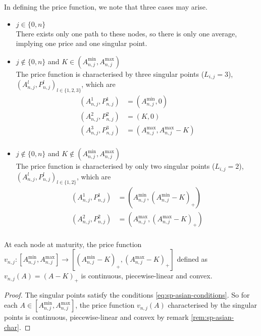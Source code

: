 In defining the price function, we note that three cases may arise.
\begin{itemize}
\item $ j \in \{ 0, n \} $ \\
	There exists only one path to these nodes, so there is only one average, implying one price and one singular point.
	
\item $ j \notin \{ 0, n \} $ and $ K \in ( A_{n,j}^{\min}, A_{n,j}^{\max} ) $ \\	
	The price function is characterised by three singular points ($ L_{i,j} = 3 $), $ ( A_{n,j}^l , P_{n,j}^l )_{l \in \{ 1, 2, 3 \} } $, which are \\
	\begin{equation} \label{eq:sp-asian-price-maturity-kin}
		\begin{aligned}
			( A_{n,j}^1 , P_{n,j}^1 ) &= ( A_{n,j}^{\min} , 0 ) \\
			( A_{n,j}^2 , P_{n,j}^2 ) &= ( K , 0 ) \\
			( A_{n,j}^3 , P_{n,j}^3 ) &= ( A_{n,j}^{\max} , A_{n,j}^{\max} - K ) \\
		\end{aligned}
	\end{equation} \label{eq:sp-asian-price-maturity-kout}
	
\item $ j \notin \{ 0, n \} $ and $ K \notin ( A_{n,j}^{\min}, A_{n,j}^{\max} ) $ \\
	The price function is characterised by only two singular points ($ L_{i,j} = 2 $), $ ( A_{n,j}^l , P_{n,j}^l )_{l \in \{ 1, 2 \} } $, which are \\
	\begin{equation}
		\begin{aligned}
			( A_{n,j}^1 , P_{n,j}^1 ) &= ( A_{n,j}^{\min} , ( A_{n,j}^{\min} - K )_+ ) \\
			( A_{n,j}^2 , P_{n,j}^2 ) &= ( A_{n,j}^{\max} , ( A_{n,j}^{\max} - K )_+ ) \\
		\end{aligned}
	\end{equation}
\end{itemize}

\begin{lmm}
	\label{lmm:sp-asian-pr-maturity}
	At each node at maturity, the price function $ { v_{n,j}: \left[ A_{n,j}^{\min}, A_{n,j}^{\max} \right] \to \left[ ( A_{n,j}^{\min} - K )_+ , ( A_{n,j}^{\max} - K )_+ \right] } $ defined as $ v_{n,j}(A) = (A - K)_+ $ is continuous, piecewise-linear and convex.
\end{lmm}
\begin{proof}
	The singular points satisfy the conditions \ref{eq:sp-asian-conditions}. So for each $ A \in \left[ A_{n,j}^{\min}, A_{n,j}^{\max} \right] $, the price function ${ v_{n,j}(A) }$ characterised by the singular points is continuous, piecewise-linear and convex by remark \ref{rem:sp-asian-char}.
\end{proof}




